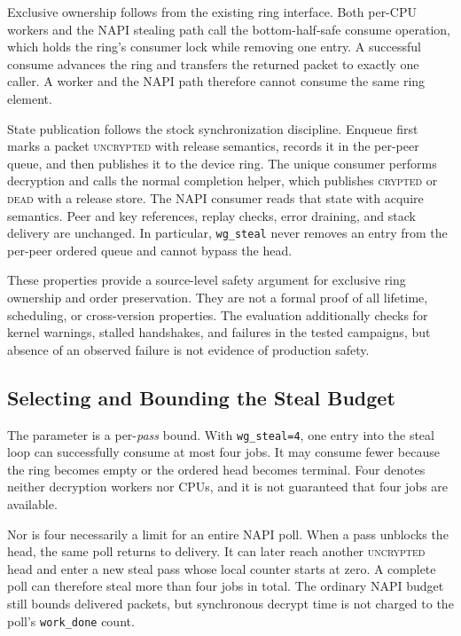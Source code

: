 Exclusive ownership follows from the existing ring interface.  Both per-CPU
workers and the NAPI stealing path call the bottom-half-safe consume operation,
which holds the ring's consumer lock while removing one entry.  A successful
consume advances the ring and transfers the returned packet to exactly one
caller.  A worker and the NAPI path therefore cannot consume the same ring
element.

State publication follows the stock synchronization discipline.  Enqueue first
marks a packet \textsc{uncrypted} with release semantics, records it in the
per-peer queue, and then publishes it to the device ring.  The unique consumer
performs decryption and calls the normal completion helper, which publishes
\textsc{crypted} or \textsc{dead} with a release store.  The NAPI consumer reads
that state with acquire semantics.  Peer and key references, replay checks,
error draining, and stack delivery are unchanged.  In particular,
\texttt{wg\_steal} never removes an entry from the per-peer ordered queue and
cannot bypass the head.

These properties provide a source-level safety argument for exclusive ring
ownership and order preservation.  They are not a formal proof of all lifetime,
scheduling, or cross-version properties.  The evaluation additionally checks
for kernel warnings, stalled handshakes, and failures in the tested campaigns,
but absence of an observed failure is not evidence of production safety.

\subsection{Selecting and Bounding the Steal Budget}
\label{sec:design-budget}

The parameter is a per-\emph{pass} bound.  With
\texttt{wg\_steal=4}, one entry into the steal loop can successfully consume at
most four jobs.  It may consume fewer because the ring becomes empty or the
ordered head becomes terminal.  Four denotes neither decryption workers nor
CPUs, and it is not guaranteed that four jobs are available.

Nor is four necessarily a limit for an entire NAPI poll.  When a pass unblocks
the head, the same poll returns to delivery.  It can later reach another
\textsc{uncrypted} head and enter a new steal pass whose local counter starts
at zero.  A complete poll can therefore steal more than four jobs in total.
The ordinary NAPI budget still bounds delivered packets, but synchronous
decrypt time is not charged to the poll's \texttt{work\_done} count.

